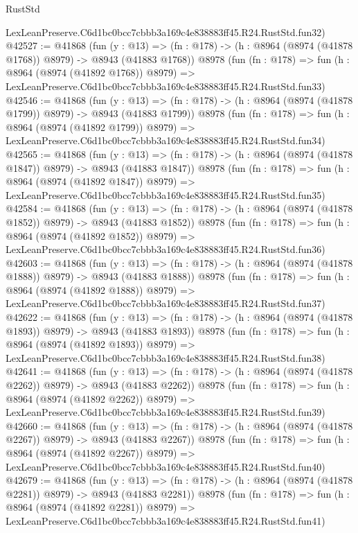 \begin{lexlean}{RustStd}
\begin{coremodule}
    LexLeanPreserve.C6d1bc0bcc7cbbb3a169c4e838883ff45.R24.RustStd.fun32)
@42527 := @41868
    (fun (y : @13) =>
    (fn : @178) -> (h : @8964 (@8974 (@41878 @1768)) @8979) -> @8943 (@41883 @1768))
    @8978
    (fun (fn : @178) =>
    fun (h : @8964 (@8974 (@41892 @1768)) @8979) =>
    LexLeanPreserve.C6d1bc0bcc7cbbb3a169c4e838883ff45.R24.RustStd.fun33)
@42546 := @41868
    (fun (y : @13) =>
    (fn : @178) -> (h : @8964 (@8974 (@41878 @1799)) @8979) -> @8943 (@41883 @1799))
    @8978
    (fun (fn : @178) =>
    fun (h : @8964 (@8974 (@41892 @1799)) @8979) =>
    LexLeanPreserve.C6d1bc0bcc7cbbb3a169c4e838883ff45.R24.RustStd.fun34)
@42565 := @41868
    (fun (y : @13) =>
    (fn : @178) -> (h : @8964 (@8974 (@41878 @1847)) @8979) -> @8943 (@41883 @1847))
    @8978
    (fun (fn : @178) =>
    fun (h : @8964 (@8974 (@41892 @1847)) @8979) =>
    LexLeanPreserve.C6d1bc0bcc7cbbb3a169c4e838883ff45.R24.RustStd.fun35)
@42584 := @41868
    (fun (y : @13) =>
    (fn : @178) -> (h : @8964 (@8974 (@41878 @1852)) @8979) -> @8943 (@41883 @1852))
    @8978
    (fun (fn : @178) =>
    fun (h : @8964 (@8974 (@41892 @1852)) @8979) =>
    LexLeanPreserve.C6d1bc0bcc7cbbb3a169c4e838883ff45.R24.RustStd.fun36)
@42603 := @41868
    (fun (y : @13) =>
    (fn : @178) -> (h : @8964 (@8974 (@41878 @1888)) @8979) -> @8943 (@41883 @1888))
    @8978
    (fun (fn : @178) =>
    fun (h : @8964 (@8974 (@41892 @1888)) @8979) =>
    LexLeanPreserve.C6d1bc0bcc7cbbb3a169c4e838883ff45.R24.RustStd.fun37)
@42622 := @41868
    (fun (y : @13) =>
    (fn : @178) -> (h : @8964 (@8974 (@41878 @1893)) @8979) -> @8943 (@41883 @1893))
    @8978
    (fun (fn : @178) =>
    fun (h : @8964 (@8974 (@41892 @1893)) @8979) =>
    LexLeanPreserve.C6d1bc0bcc7cbbb3a169c4e838883ff45.R24.RustStd.fun38)
@42641 := @41868
    (fun (y : @13) =>
    (fn : @178) -> (h : @8964 (@8974 (@41878 @2262)) @8979) -> @8943 (@41883 @2262))
    @8978
    (fun (fn : @178) =>
    fun (h : @8964 (@8974 (@41892 @2262)) @8979) =>
    LexLeanPreserve.C6d1bc0bcc7cbbb3a169c4e838883ff45.R24.RustStd.fun39)
@42660 := @41868
    (fun (y : @13) =>
    (fn : @178) -> (h : @8964 (@8974 (@41878 @2267)) @8979) -> @8943 (@41883 @2267))
    @8978
    (fun (fn : @178) =>
    fun (h : @8964 (@8974 (@41892 @2267)) @8979) =>
    LexLeanPreserve.C6d1bc0bcc7cbbb3a169c4e838883ff45.R24.RustStd.fun40)
@42679 := @41868
    (fun (y : @13) =>
    (fn : @178) -> (h : @8964 (@8974 (@41878 @2281)) @8979) -> @8943 (@41883 @2281))
    @8978
    (fun (fn : @178) =>
    fun (h : @8964 (@8974 (@41892 @2281)) @8979) =>
    LexLeanPreserve.C6d1bc0bcc7cbbb3a169c4e838883ff45.R24.RustStd.fun41)

\end{coremodule}
\end{lexlean}
